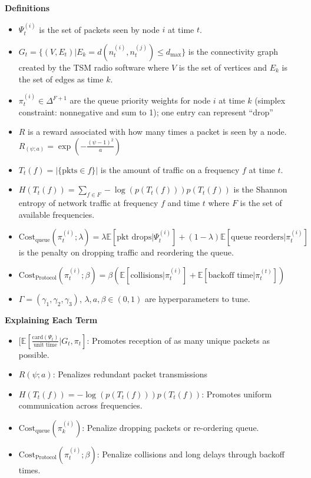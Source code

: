 \documentclass{article}
\begin{document}
\textbf{Definitions}
\begin{itemize}
    \item $\Psi_{t}^{(i)}$ is the set of packets seen by node $i$ at time $t$.
    \item $G_{t} = \{ (V, E_{t}) | E_{k} = d(n_{t}^{(i)}, n_{t}^{(j)}) \le d_{\text{max}} \}$ is the connectivity graph created by the TSM radio software where $V$ is the set of vertices and $E_{k}$ is the set of edges as time $k$.
    \item $\pi_{t}^{(i)}\in\Delta^{F+1}$ are the queue priority weights for node $i$ at time $k$ (simplex constraint: nonnegative and sum to 1); one entry can represent ``drop''
    \item $R$ is a reward associated with how many times a packet is seen by a node. $R_(\psi; a) = \exp(- \frac{(\psi - 1)^{2}}{a})$
    \item $T_{t}(f) = | \{ \text{pkts} \in f\} |$ is the amount of traffic on a frequency $f$ at time $t$.
    \item $H(T_{t}(f))= \sum _{f \in F} -\log(p(T_{t}(f))) p(T_{t}(f))$ is the Shannon entropy of network traffic at frequency $f$ and time $t$ where $F$ is the set of available frequencies.
    \item $\text{Cost}_{\text{queue}}(\pi_{t}^{(i)}; \lambda) = \lambda \mathbb{E}[\text{pkt drops}| \Psi_{t}^{(i)}] + (1 - \lambda) \mathbb{E}[\text{queue reorders}| \pi_{t}^{(i)}]$ is the penalty on dropping traffic and reordering the queue.
    \item $\text{Cost}_{\text{Protocol}}(\pi_{t}^{(i)}; \beta) = \beta (\mathbb{E}[ \text{collisions} | \pi_{t}^{(i)}] + \mathbb{E}[ \text{backoff time} | \pi_{t}^{(t)}])$
    \item $\Gamma = (\gamma_{1}, \gamma_{2}, \gamma_{3})$, $\lambda, a , \beta\in (0, 1)$ are hyperparameters to tune.
\end{itemize}


\vspace{1 cm}

\textbf{Explaining Each Term}
\begin{itemize}
    \item $ [ \mathbb{E}[\frac{\text{card}(\Psi_{t})}{\text{unit time}} | G_{t}, \pi_{t}]$: Promotes reception of as many unique packets as possible.
    \item $R(\psi; a)$: Penalizes redundant packet transmissions
    \item $H(T_{t}(f))= -\log(p(T_{t}(f))) p(T_{t}(f))$: Promotes uniform communication across frequencies.
    \item $\text{Cost}_{\text{queue}}(\pi_{k}^{(i)})$: Penalize dropping packets or re-ordering queue.
    \item $\text{Cost}_{\text{Protocol}}(\pi_{t}^{(i)}; \beta)$: Penalize collisions and long delays through backoff times. 
\end{itemize}
\end{document}
